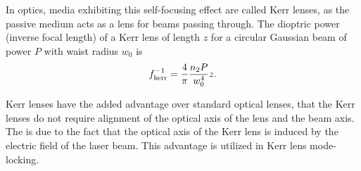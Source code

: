 In optics, media exhibiting this self-focusing effect are called Kerr
lenses, as the passive medium acts as a lens for beams passing
through. The dioptric power (inverse focal length) of a Kerr lens of
length $z$ for a circular Gaussian beam of power $P$ with waist radius
$w_0$ is
\cite{yefet-kerrlens}
\begin{align}
  \label{eq:kerr-focal-length}
  f_{\textup{kerr}}^{-1} = \frac{4}{\pi} \frac{n_2 P}{w_0^4} z.
\end{align}

Kerr lenses have the added advantage over standard optical lenses,
that the Kerr lenses do not require alignment of the optical axis of
the lens and the beam axis. The is due to the fact that the optical
axis of the Kerr lens is induced by the electric field of the laser
beam. This advantage is utilized in Kerr lens mode-locking.



